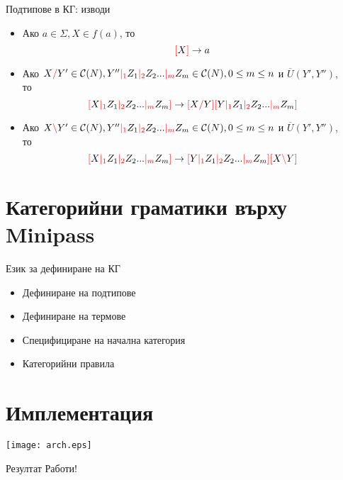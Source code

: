 \documentclass[9pt]{beamer}
\begin{document}
  \begin{frame}{Подтипове в КГ: изводи}
    \begin{itemize}
        \item Ако $ a \in \Sigma, X \in f(a) $, то \[ \textcolor{red}{[} X \textcolor{red}{]} \rightarrow a \]
        \item Ако $ X \textcolor{red}{/} Y' \in \mathcal{C}( N ), Y'' \textcolor{red}{|_{1}} Z_1 \textcolor{red}{|_{2}} Z_2 ... \textcolor{red}{|_{m}} Z_m \in \mathcal{C}( N ), 0 \leq m \leq n $
            и $\overline{U}(Y', Y'')$, \\
            то \[ \textcolor{red}{[} X \textcolor{red}{|_{1}} Z_1 \textcolor{red}{|_{2}} Z_2 ... \textcolor{red}{|_{m}} Z_m \textcolor{red}{]} \rightarrow \textcolor{red}{[} X \textcolor{red}{/} Y \textcolor{red}{]} \textcolor{red}{[} Y \textcolor{red}{|_{1}} Z_1 \textcolor{red}{|_{2}} Z_2 ... \textcolor{red}{|_{m}} Z_m \textcolor{red}{]} \]
        \item Ако $ X \textcolor{red}{\backslash} Y' \in \mathcal{C}( N ), Y'' \textcolor{red}{|_{1}} Z_1 \textcolor{red}{|_{2}} Z_2 ... \textcolor{red}{|_{m}} Z_m \in \mathcal{C}( N ), 0 \leq m \leq n $
            и $\overline{U}(Y', Y'')$, \\
            то \[ \textcolor{red}{[} X \textcolor{red}{|_{1}} Z_1 \textcolor{red}{|_{2}} Z_2 ... \textcolor{red}{|_{m}} Z_m \textcolor{red}{]} \rightarrow \textcolor{red}{[} Y \textcolor{red}{|_{1}} Z_1 \textcolor{red}{|_{2}} Z_2 ... \textcolor{red}{|_{m}} Z_m \textcolor{red}{]} \textcolor{red}{[} X \textcolor{red}{\backslash} Y \textcolor{red}{]} \]
    \end{itemize}
  \end{frame}

  \section{Категорийни граматики върху Minipass}
  \begin{frame}{Език за дефиниране на КГ}
    \begin{itemize}
      \item Дефиниране на подтипове
      \item Дефиниране на термове
      \item Специфициране на начална категория
      \item Категорийни правила
    \end{itemize}
  \end{frame}
  \section{Имплементация}
  \begin{frame}
    \begin{center}
      \texttt{[image: arch.eps]}
    \end{center}
  \end{frame}

  \begin{frame}{Резултат}
    Работи! \pika
  \end{frame}
\end{document}
